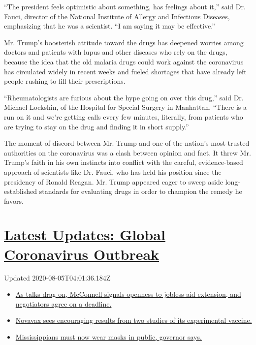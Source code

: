 ``The president feels optimistic about something, has feelings about
it,'' said Dr. Fauci, director of the National Institute of Allergy and
Infectious Diseases, emphasizing that he was a scientist. ``I am saying
it may be effective.''

Mr. Trump's boosterish attitude toward the drugs has deepened worries
among doctors and patients with lupus and other diseases who rely on the
drugs, because the idea that the old malaria drugs could work against
the coronavirus has circulated widely in recent weeks and fueled
shortages that have already left people rushing to fill their
prescriptions.

``Rheumatologists are furious about the hype going on over this drug,''
said Dr. Michael Lockshin, of the Hospital for Special Surgery in
Manhattan. ``There is a run on it and we're getting calls every few
minutes, literally, from patients who are trying to stay on the drug and
finding it in short supply.''

The moment of discord between Mr. Trump and one of the nation's most
trusted authorities on the coronavirus was a clash between opinion and
fact. It threw Mr. Trump's faith in his own instincts into conflict with
the careful, evidence-based approach of scientists like Dr. Fauci, who
has held his position since the presidency of Ronald Reagan. Mr. Trump
appeared eager to sweep aside long-established standards for evaluating
drugs in order to champion the remedy he favors.

\hypertarget{latest-updates-global-coronavirus-outbreak}{%
\section{\texorpdfstring{\href{https://www.nytimes.com/2020/08/04/world/coronavirus-cases.html?action=click\&pgtype=Article\&state=default\&region=MAIN_CONTENT_1\&context=storylines_live_updates}{Latest
Updates: Global Coronavirus
Outbreak}}{Latest Updates: Global Coronavirus Outbreak}}\label{latest-updates-global-coronavirus-outbreak}}

Updated 2020-08-05T04:01:36.184Z

\begin{itemize}
\tightlist
\item
  \href{https://www.nytimes.com/2020/08/04/world/coronavirus-cases.html?action=click\&pgtype=Article\&state=default\&region=MAIN_CONTENT_1\&context=storylines_live_updates\#link-762df92}{As
  talks drag on, McConnell signals openness to jobless aid extension,
  and negotiators agree on a deadline.}
\item
  \href{https://www.nytimes.com/2020/08/04/world/coronavirus-cases.html?action=click\&pgtype=Article\&state=default\&region=MAIN_CONTENT_1\&context=storylines_live_updates\#link-1228a480}{Novavax
  sees encouraging results from two studies of its experimental
  vaccine.}
\item
  \href{https://www.nytimes.com/2020/08/04/world/coronavirus-cases.html?action=click\&pgtype=Article\&state=default\&region=MAIN_CONTENT_1\&context=storylines_live_updates\#link-794484ed}{Mississippians
  must now wear masks in public, governor says.}
\end{itemize}

